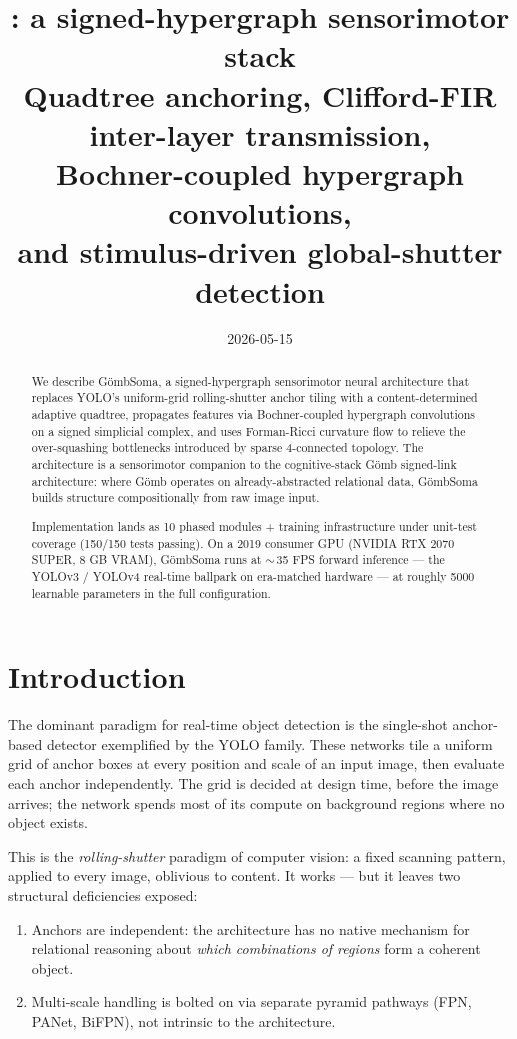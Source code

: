 \documentclass[11pt,a4paper]{article}
\title{\GS{}: a signed-hypergraph sensorimotor stack \\
       \large{Quadtree anchoring, Clifford-FIR inter-layer transmission, \\
              Bochner-coupled hypergraph convolutions, \\
              and stimulus-driven global-shutter detection}}
\date{2026-05-15}
\author{}
\newcommand{\GS}{G\"ombSoma}
\newcommand{\Gomb}{G\"omb}
\begin{document}
\maketitle
\thispagestyle{fancy}

\begin{abstract}
\noindent We describe \GS, a signed-hypergraph sensorimotor neural
architecture that replaces YOLO's uniform-grid rolling-shutter
anchor tiling with a content-determined adaptive quadtree, propagates
features via Bochner-coupled hypergraph convolutions on a signed
simplicial complex, and uses Forman-Ricci curvature flow to relieve
the over-squashing bottlenecks introduced by sparse 4-connected
topology. The architecture is a sensorimotor companion to the
cognitive-stack \Gomb{} signed-link architecture: where \Gomb{}
operates on already-abstracted relational data, \GS{} builds
structure compositionally from raw image input.

Implementation lands as 10 phased modules + training infrastructure
under unit-test coverage (150/150 tests passing). On a 2019
consumer GPU (NVIDIA RTX 2070 SUPER, 8 GB VRAM), \GS{} runs at
$\sim$\,35 FPS forward inference — the YOLOv3 / YOLOv4 real-time
ballpark on era-matched hardware — at roughly 5000 learnable
parameters in the full configuration.
\end{abstract}

\tableofcontents

\section{Introduction}

The dominant paradigm for real-time object detection is the
single-shot anchor-based detector exemplified by the YOLO family.
These networks tile a uniform grid of anchor boxes at every
position and scale of an input image, then evaluate each anchor
independently. The grid is decided at design time, before the
image arrives; the network spends most of its compute on background
regions where no object exists.

This is the \emph{rolling-shutter} paradigm of computer vision: a
fixed scanning pattern, applied to every image, oblivious to
content. It works — but it leaves two structural deficiencies
exposed:

\begin{enumerate}
\item Anchors are independent: the architecture has no native
  mechanism for relational reasoning about \emph{which combinations
  of regions} form a coherent object.
\item Multi-scale handling is bolted on via separate pyramid
  pathways (FPN, PANet, BiFPN), not intrinsic to the architecture.
\end{enumerate}
\end{document}
